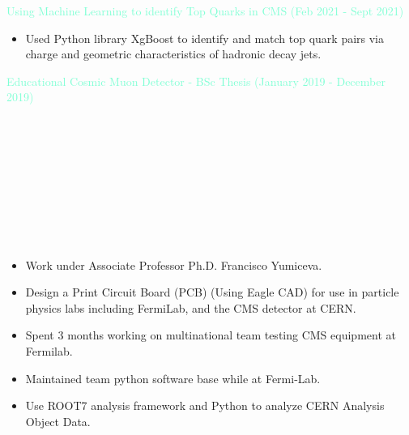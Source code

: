 \documentclass[10pt,a4paper,ragged2e,withhyper]{altacv}
\begin{document}
\begin{paracol}{2}
\textcolor{Aquamarine}{Using Machine Learning to identify Top Quarks in CMS (Feb 2021 - Sept 2021)}
\begin{itemize}
    \item Used Python library XgBoost to identify and match top quark pairs via charge and geometric characteristics of  hadronic decay jets.
\end{itemize}
\textcolor{Aquamarine}{Educational Cosmic Muon Detector - BSc Thesis (January 2019 - December 2019)}
\switchcolumn


\\
\\
\\



\\


\medskip




 \\



 \\



\begin{itemize}
\item Work under Associate Professor Ph.D. Francisco Yumiceva.
\item Design a Print Circuit Board (PCB) (Using Eagle CAD) for use in particle physics labs including FermiLab, and the CMS detector at CERN.
\item Spent 3 months working on multinational team testing CMS equipment at Fermilab.
\item Maintained team python software base while at Fermi-Lab.
\item Use ROOT7 analysis framework and Python to analyze CERN Analysis Object Data.
\end{itemize}

\end{paracol}
\end{document}
